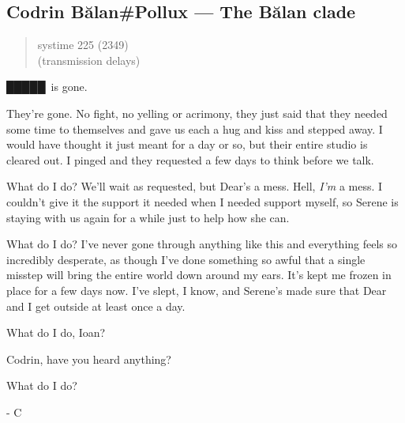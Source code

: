 \hypertarget{codrin-bux103lanpollux-the-bux103lan-clade}{%
\subsection{Codrin Bălan\#Pollux — The Bălan clade}\label{codrin-bux103lanpollux-the-bux103lan-clade}}

\begin{quote}
systime 225 (2349)\\
(transmission delays)
\end{quote}

█████\ is gone.

They're gone. No fight, no yelling or acrimony, they just said that they needed some time to themselves and gave us each a hug and kiss and stepped away. I would have thought it just meant for a day or so, but their entire studio is cleared out. I pinged and they requested a few days to think before we talk.

What do I do? We'll wait as requested, but Dear's a mess. Hell, \emph{I'm} a mess. I couldn't give it the support it needed when I needed support myself, so Serene is staying with us again for a while just to help how she can.

What do I do? I've never gone through anything like this and everything feels so incredibly desperate, as though I've done something so awful that a single misstep will bring the entire world down around my ears. It's kept me frozen in place for a few days now. I've slept, I know, and Serene's made sure that Dear and I get outside at least once a day.

What do I do, Ioan?

Codrin, have you heard anything?

What do I do?

- C
